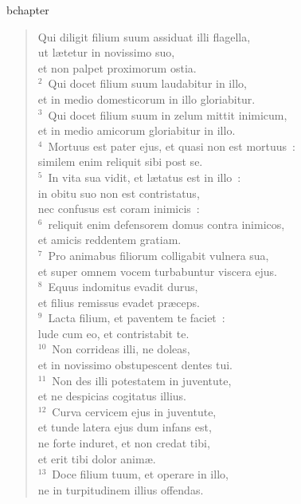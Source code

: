 bchapter\begin{verse}\vspace{-19pt}Qui diligit filium suum assiduat illi flagella,\\ ut l\ae tetur in novissimo suo,\\ et non palpet proximorum ostia.\\
${}^{2}$~Qui docet filium suum laudabitur in illo,\\ et in medio domesticorum in illo gloriabitur.\\
${}^{3}$~Qui docet filium suum in zelum mittit inimicum,\\ et in medio amicorum gloriabitur in illo.\\
${}^{4}$~Mortuus est pater ejus, et quasi non est mortuus~:\\ similem enim reliquit sibi post se.\\
${}^{5}$~In vita sua vidit, et l\ae tatus est in illo~:\\ in obitu suo non est contristatus,\\ nec confusus est coram inimicis~:\\
${}^{6}$~reliquit enim defensorem domus contra inimicos,\\ et amicis reddentem gratiam.\\
${}^{7}$~Pro animabus filiorum colligabit vulnera sua,\\ et super omnem vocem turbabuntur viscera ejus.\\
${}^{8}$~Equus indomitus evadit durus,\\ et filius remissus evadet pr\ae ceps.\\
${}^{9}$~Lacta filium, et paventem te faciet~:\\ lude cum eo, et contristabit te.\\
${}^{10}$~Non corrideas illi, ne doleas,\\ et in novissimo obstupescent dentes tui.\\
${}^{11}$~Non des illi potestatem in juventute,\\ et ne despicias cogitatus illius.\\
${}^{12}$~Curva cervicem ejus in juventute,\\ et tunde latera ejus dum infans est,\\ ne forte induret, et non credat tibi,\\ et erit tibi dolor anim\ae .\\
${}^{13}$~Doce filium tuum, et operare in illo,\\ ne in turpitudinem illius offendas.\end{verse}


